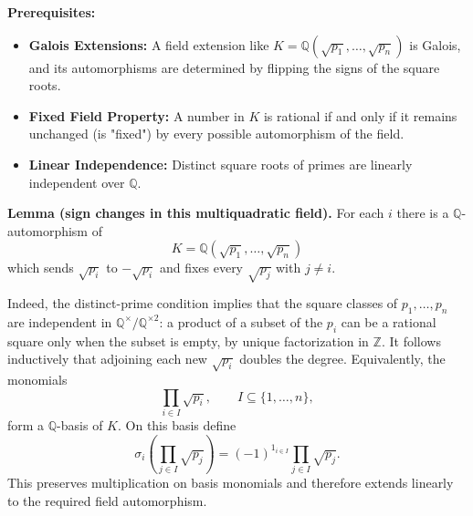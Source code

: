 \begin{solution}
\textbf{Prerequisites:}
\begin{itemize}
    \item \textbf{Galois Extensions:} A field extension like $K = \mathbb{Q}(\sqrt{p_1}, \dots, \sqrt{p_n})$ is Galois, and its automorphisms are determined by flipping the signs of the square roots.
    \item \textbf{Fixed Field Property:} A number in $K$ is rational if and only if it remains unchanged (is "fixed") by every possible automorphism of the field.
    \item \textbf{Linear Independence:} Distinct square roots of primes are linearly independent over $\mathbb{Q}$.
\end{itemize}

\textbf{Lemma (sign changes in this multiquadratic field).}
For each $i$ there is a $\mathbb{Q}$-automorphism of
\[
K=\mathbb{Q}(\sqrt{p_1},\ldots,\sqrt{p_n})
\]
which sends $\sqrt{p_i}$ to $-\sqrt{p_i}$ and fixes every $\sqrt{p_j}$ with $j\neq i$.

Indeed, the distinct-prime condition implies that the square classes of $p_1,\ldots,p_n$ are independent in $\mathbb{Q}^\times/\mathbb{Q}^{\times 2}$: a product of a subset of the $p_i$ can be a rational square only when the subset is empty, by unique factorization in $\mathbb{Z}$. It follows inductively that adjoining each new $\sqrt{p_i}$ doubles the degree. Equivalently, the monomials
\[
\prod_{i\in I}\sqrt{p_i},
\qquad I\subseteq \{1,\ldots,n\},
\]
form a $\mathbb{Q}$-basis of $K$. On this basis define
\[
\sigma_i\left(\prod_{j\in I}\sqrt{p_j}\right)
=(-1)^{1_{i\in I}}\prod_{j\in I}\sqrt{p_j}.
\]
This preserves multiplication on basis monomials and therefore extends linearly to the required field automorphism.


\end{solution}
